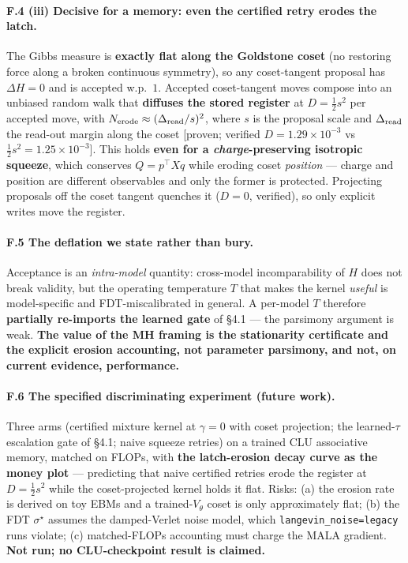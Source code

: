 \documentclass[11pt]{article}
\newcommand{\half}{\tfrac12}
\begin{document}
\paragraph{F.4 (iii) Decisive for a memory: even the certified retry erodes the latch.} The Gibbs measure is \textbf{exactly flat along the Goldstone coset} (no restoring force along a broken continuous symmetry), so any coset-tangent proposal has $\Delta H=0$ and is accepted w.p.\ $1$. Accepted coset-tangent moves compose into an unbiased random walk that \textbf{diffuses the stored register} at $D=\half s^2$ per accepted move, with $N_{\rm erode}\approx(\Delta_{\rm read}/s)^2$, where $s$ is the proposal scale and $\Delta_{\rm read}$ the read-out margin along the coset [proven; verified $D=1.29{\times}10^{-3}$ vs $\half s^2=1.25{\times}10^{-3}$]. This holds \textbf{even for a \emph{charge}-preserving isotropic squeeze}, which conserves $Q=p^\top Xq$ while eroding coset \emph{position} --- charge and position are different observables and only the former is protected. Projecting proposals off the coset tangent quenches it ($D=0$, verified), so only explicit writes move the register.

\paragraph{F.5 The deflation we state rather than bury.} Acceptance is an \emph{intra-model} quantity: cross-model incomparability of $H$ does not break validity, but the operating temperature $T$ that makes the kernel \emph{useful} is model-specific and FDT-miscalibrated in general. A per-model $T$ therefore \textbf{partially re-imports the learned gate} of \S4.1 --- the parsimony argument is weak. \textbf{The value of the MH framing is the stationarity certificate and the explicit erosion accounting, not parameter parsimony, and not, on current evidence, performance.}

\paragraph{F.6 The specified discriminating experiment (future work).} Three arms (certified mixture kernel at $\gamma=0$ with coset projection; the learned-$\tau$ escalation gate of \S4.1; naive squeeze retries) on a trained CLU associative memory, matched on FLOPs, with \textbf{the latch-erosion decay curve as the money plot} --- predicting that naive certified retries erode the register at $D=\half s^2$ while the coset-projected kernel holds it flat. Risks: (a) the erosion rate is derived on toy EBMs and a trained-$V_\theta$ coset is only approximately flat; (b) the FDT $\sigma^\star$ assumes the damped-Verlet noise model, which \texttt{langevin\_noise=legacy} runs violate; (c) matched-FLOPs accounting must charge the MALA gradient. \textbf{Not run; no CLU-checkpoint result is claimed.}
\end{document}
